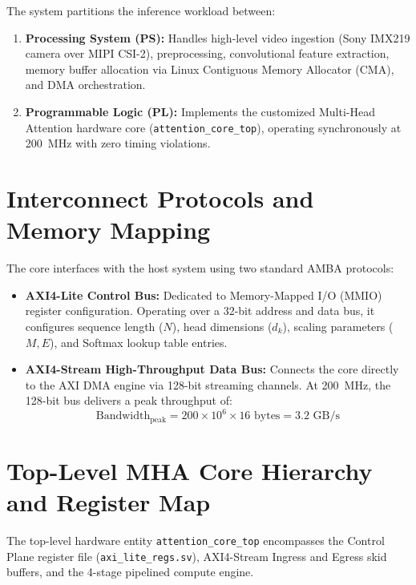 The system partitions the inference workload between:
\begin{enumerate}
    \item \textbf{Processing System (PS):} Handles high-level video ingestion (Sony IMX219 camera over MIPI CSI-2), preprocessing, convolutional feature extraction, memory buffer allocation via Linux Contiguous Memory Allocator (CMA), and DMA orchestration.
    \item \textbf{Programmable Logic (PL):} Implements the customized Multi-Head Attention hardware core (\texttt{attention\_core\_top}), operating synchronously at 200~MHz with zero timing violations.
\end{enumerate}

\section{Interconnect Protocols and Memory Mapping}
The core interfaces with the host system using two standard AMBA protocols:
\begin{itemize}
    \item \textbf{AXI4-Lite Control Bus:} Dedicated to Memory-Mapped I/O (MMIO) register configuration. Operating over a 32-bit address and data bus, it configures sequence length ($N$), head dimensions ($d_k$), scaling parameters ($M, E$), and Softmax lookup table entries.
    \item \textbf{AXI4-Stream High-Throughput Data Bus:} Connects the core directly to the AXI DMA engine via 128-bit streaming channels. At 200~MHz, the 128-bit bus delivers a peak throughput of:
    \begin{equation}
        \text{Bandwidth}_{\text{peak}} = 200 \times 10^6 \times 16\text{ bytes} = 3.2\text{ GB/s}
    \end{equation}
\end{itemize}

\section{Top-Level MHA Core Hierarchy and Register Map}
The top-level hardware entity \texttt{attention\_core\_top} encompasses the Control Plane register file (\texttt{axi\_lite\_regs.sv}), AXI4-Stream Ingress and Egress skid buffers, and the 4-stage pipelined compute engine.


